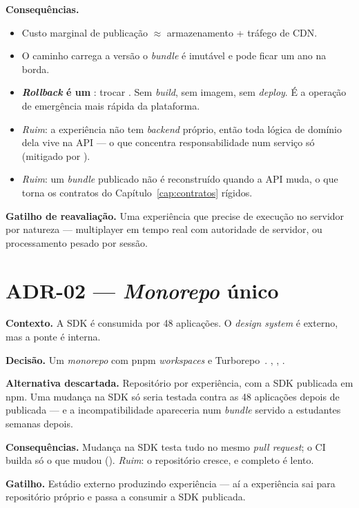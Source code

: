 \textbf{Consequências.}
\begin{itemize}
  \item Custo marginal de publicação $\approx$ armazenamento + tráfego de CDN.
  \item O caminho carrega a versão \implica{} o \emph{bundle} é imutável e pode
    ficar um ano na borda.
  \item \textbf{\emph{Rollback} é um }: trocar . Sem
    \emph{build}, sem imagem, sem \emph{deploy}. É a operação de emergência mais
    rápida da plataforma.
  \item \emph{Ruim}: a experiência não tem \emph{backend} próprio, então toda
    lógica de domínio dela vive na API --- o que concentra responsabilidade num
    serviço só (mitigado por ).
  \item \emph{Ruim}: um \emph{bundle} publicado não é reconstruído quando a API
    muda, o que torna os contratos do Capítulo~\ref{cap:contratos} rígidos.
\end{itemize}

\textbf{Gatilho de reavaliação.} Uma experiência que precise de execução no
servidor por natureza --- multiplayer em tempo real com autoridade de servidor, ou
processamento pesado por sessão.

\section{ADR-02 --- \emph{Monorepo} único}

\textbf{Contexto.} A SDK é consumida por 48 aplicações. O \emph{design system} é
externo, mas a ponte é interna.

\textbf{Decisão.} Um \emph{monorepo} com pnpm \emph{workspaces} e
Turborepo~\cite{turborepo2026}. , ,
.

\textbf{Alternativa descartada.} Repositório por experiência, com a SDK publicada
em npm. Uma mudança na SDK só seria testada contra as 48 aplicações depois de
publicada --- e a incompatibilidade apareceria num \emph{bundle} servido a estudantes
semanas depois.

\textbf{Consequências.} Mudança na SDK testa tudo no mesmo \emph{pull request};
o CI builda só o que mudou (). \emph{Ruim}: o
repositório cresce, e  completo é lento.

\textbf{Gatilho.} Estúdio externo produzindo experiência --- aí a experiência sai
para repositório próprio e passa a consumir a SDK publicada.

